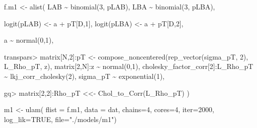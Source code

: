 \documentclass[
]{article}
\newenvironment{Shaded}{\begin{snugshade}}{\end{snugshade}}
\newcommand{\AttributeTok}[1]{\textcolor[rgb]{0.77,0.63,0.00}{#1}}
\newcommand{\ConstantTok}[1]{\textcolor[rgb]{0.00,0.00,0.00}{#1}}
\newcommand{\DecValTok}[1]{\textcolor[rgb]{0.00,0.00,0.81}{#1}}
\newcommand{\FunctionTok}[1]{\textcolor[rgb]{0.00,0.00,0.00}{#1}}
\newcommand{\NormalTok}[1]{#1}
\newcommand{\OtherTok}[1]{\textcolor[rgb]{0.56,0.35,0.01}{#1}}
\newcommand{\SpecialCharTok}[1]{\textcolor[rgb]{0.00,0.00,0.00}{#1}}
\newcommand{\StringTok}[1]{\textcolor[rgb]{0.31,0.60,0.02}{#1}}
\begin{document}
\begin{Shaded}
\begin{Highlighting}[]
\NormalTok{f.m1 }\OtherTok{\textless{}{-}} \FunctionTok{alist}\NormalTok{(}
\NormalTok{    LAB }\SpecialCharTok{\textasciitilde{}} \FunctionTok{binomial}\NormalTok{(}\DecValTok{3}\NormalTok{, pLAB),}
\NormalTok{    LBA }\SpecialCharTok{\textasciitilde{}} \FunctionTok{binomial}\NormalTok{(}\DecValTok{3}\NormalTok{, pLBA),}

    \FunctionTok{logit}\NormalTok{(pLAB) }\OtherTok{\textless{}{-}}\NormalTok{ a }\SpecialCharTok{+}\NormalTok{ pT[D,}\DecValTok{1}\NormalTok{],}
    \FunctionTok{logit}\NormalTok{(pLBA) }\OtherTok{\textless{}{-}}\NormalTok{ a }\SpecialCharTok{+}\NormalTok{ pT[D,}\DecValTok{2}\NormalTok{],}

\NormalTok{    a }\SpecialCharTok{\textasciitilde{}} \FunctionTok{normal}\NormalTok{(}\DecValTok{0}\NormalTok{,}\DecValTok{1}\NormalTok{),}

\NormalTok{    transpars}\SpecialCharTok{\textgreater{}}\NormalTok{ matrix[N,}\DecValTok{2}\NormalTok{]}\SpecialCharTok{:}\NormalTok{pT }\OtherTok{\textless{}{-}} 
        \FunctionTok{compose\_noncentered}\NormalTok{(}\FunctionTok{rep\_vector}\NormalTok{(sigma\_pT, }\DecValTok{2}\NormalTok{), L\_Rho\_pT, z),}
\NormalTok{    matrix[}\DecValTok{2}\NormalTok{,N]}\SpecialCharTok{:}\NormalTok{z }\SpecialCharTok{\textasciitilde{}} \FunctionTok{normal}\NormalTok{(}\DecValTok{0}\NormalTok{,}\DecValTok{1}\NormalTok{),}
\NormalTok{    cholesky\_factor\_corr[}\DecValTok{2}\NormalTok{]}\SpecialCharTok{:}\NormalTok{L\_Rho\_pT }\SpecialCharTok{\textasciitilde{}} \FunctionTok{lkj\_corr\_cholesky}\NormalTok{(}\DecValTok{2}\NormalTok{),}
\NormalTok{    sigma\_pT }\SpecialCharTok{\textasciitilde{}} \FunctionTok{exponential}\NormalTok{(}\DecValTok{1}\NormalTok{),}

\NormalTok{    gq}\SpecialCharTok{\textgreater{}}\NormalTok{ matrix[}\DecValTok{2}\NormalTok{,}\DecValTok{2}\NormalTok{]}\SpecialCharTok{:}\NormalTok{Rho\_pT }\OtherTok{\textless{}\textless{}{-}} \FunctionTok{Chol\_to\_Corr}\NormalTok{(L\_Rho\_pT)}
\NormalTok{)}

\NormalTok{m1 }\OtherTok{\textless{}{-}} \FunctionTok{ulam}\NormalTok{(}
    \AttributeTok{flist =}\NormalTok{ f.m1,}
    \AttributeTok{data =}\NormalTok{ dat,}
    \AttributeTok{chains=}\DecValTok{4}\NormalTok{,}
    \AttributeTok{cores=}\DecValTok{4}\NormalTok{,}
    \AttributeTok{iter=}\DecValTok{2000}\NormalTok{,}
    \AttributeTok{log\_lik=}\ConstantTok{TRUE}\NormalTok{,}
    \AttributeTok{file=}\StringTok{"./models/m1"}\NormalTok{)}
\end{Highlighting}
\end{Shaded}
\end{document}

